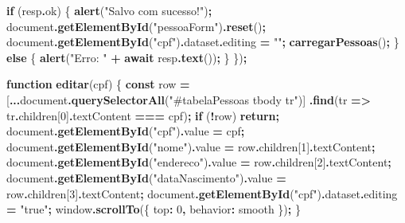 \documentclass[
]{book}
\newenvironment{Shaded}{\begin{snugshade}}{\end{snugshade}}
\newcommand{\AttributeTok}[1]{\textcolor[rgb]{0.13,0.29,0.53}{#1}}
\newcommand{\BuiltInTok}[1]{#1}
\newcommand{\ControlFlowTok}[1]{\textcolor[rgb]{0.13,0.29,0.53}{\textbf{#1}}}
\newcommand{\DataTypeTok}[1]{\textcolor[rgb]{0.13,0.29,0.53}{#1}}
\newcommand{\DecValTok}[1]{\textcolor[rgb]{0.00,0.00,0.81}{#1}}
\newcommand{\FunctionTok}[1]{\textcolor[rgb]{0.13,0.29,0.53}{\textbf{#1}}}
\newcommand{\KeywordTok}[1]{\textcolor[rgb]{0.13,0.29,0.53}{\textbf{#1}}}
\newcommand{\NormalTok}[1]{#1}
\newcommand{\OperatorTok}[1]{\textcolor[rgb]{0.81,0.36,0.00}{\textbf{#1}}}
\newcommand{\StringTok}[1]{\textcolor[rgb]{0.31,0.60,0.02}{#1}}
\begin{document}
\begin{Shaded}
\begin{Highlighting}[]
  \ControlFlowTok{if}\NormalTok{ (resp}\OperatorTok{.}\AttributeTok{ok}\NormalTok{) \{}
    \FunctionTok{alert}\NormalTok{(}\StringTok{"Salvo com sucesso!"}\NormalTok{)}\OperatorTok{;}
    \BuiltInTok{document}\OperatorTok{.}\FunctionTok{getElementById}\NormalTok{(}\StringTok{"pessoaForm"}\NormalTok{)}\OperatorTok{.}\FunctionTok{reset}\NormalTok{()}\OperatorTok{;}
    \BuiltInTok{document}\OperatorTok{.}\FunctionTok{getElementById}\NormalTok{(}\StringTok{"cpf"}\NormalTok{)}\OperatorTok{.}\AttributeTok{dataset}\OperatorTok{.}\AttributeTok{editing} \OperatorTok{=} \StringTok{""}\OperatorTok{;}
    \FunctionTok{carregarPessoas}\NormalTok{()}\OperatorTok{;}
\NormalTok{  \} }\ControlFlowTok{else}\NormalTok{ \{}
    \FunctionTok{alert}\NormalTok{(}\StringTok{"Erro: "} \OperatorTok{+} \ControlFlowTok{await}\NormalTok{ resp}\OperatorTok{.}\FunctionTok{text}\NormalTok{())}\OperatorTok{;}
\NormalTok{  \}}
\NormalTok{\})}\OperatorTok{;}

\KeywordTok{function} \FunctionTok{editar}\NormalTok{(cpf) \{}
  \KeywordTok{const}\NormalTok{ row }\OperatorTok{=}\NormalTok{ [}\OperatorTok{...}\BuiltInTok{document}\OperatorTok{.}\FunctionTok{querySelectorAll}\NormalTok{(}\StringTok{"\#tabelaPessoas tbody tr"}\NormalTok{)]}
    \OperatorTok{.}\FunctionTok{find}\NormalTok{(tr }\KeywordTok{=\textgreater{}}\NormalTok{ tr}\OperatorTok{.}\AttributeTok{children}\NormalTok{[}\DecValTok{0}\NormalTok{]}\OperatorTok{.}\AttributeTok{textContent} \OperatorTok{===}\NormalTok{ cpf)}\OperatorTok{;}
  \ControlFlowTok{if}\NormalTok{ (}\OperatorTok{!}\NormalTok{row) }\ControlFlowTok{return}\OperatorTok{;}
  \BuiltInTok{document}\OperatorTok{.}\FunctionTok{getElementById}\NormalTok{(}\StringTok{"cpf"}\NormalTok{)}\OperatorTok{.}\AttributeTok{value} \OperatorTok{=}\NormalTok{ cpf}\OperatorTok{;}
  \BuiltInTok{document}\OperatorTok{.}\FunctionTok{getElementById}\NormalTok{(}\StringTok{"nome"}\NormalTok{)}\OperatorTok{.}\AttributeTok{value} \OperatorTok{=}\NormalTok{ row}\OperatorTok{.}\AttributeTok{children}\NormalTok{[}\DecValTok{1}\NormalTok{]}\OperatorTok{.}\AttributeTok{textContent}\OperatorTok{;}
  \BuiltInTok{document}\OperatorTok{.}\FunctionTok{getElementById}\NormalTok{(}\StringTok{"endereco"}\NormalTok{)}\OperatorTok{.}\AttributeTok{value} \OperatorTok{=}\NormalTok{ row}\OperatorTok{.}\AttributeTok{children}\NormalTok{[}\DecValTok{2}\NormalTok{]}\OperatorTok{.}\AttributeTok{textContent}\OperatorTok{;}
  \BuiltInTok{document}\OperatorTok{.}\FunctionTok{getElementById}\NormalTok{(}\StringTok{"dataNascimento"}\NormalTok{)}\OperatorTok{.}\AttributeTok{value} \OperatorTok{=}\NormalTok{ row}\OperatorTok{.}\AttributeTok{children}\NormalTok{[}\DecValTok{3}\NormalTok{]}\OperatorTok{.}\AttributeTok{textContent}\OperatorTok{;}
  \BuiltInTok{document}\OperatorTok{.}\FunctionTok{getElementById}\NormalTok{(}\StringTok{"cpf"}\NormalTok{)}\OperatorTok{.}\AttributeTok{dataset}\OperatorTok{.}\AttributeTok{editing} \OperatorTok{=} \StringTok{"true"}\OperatorTok{;}
  \BuiltInTok{window}\OperatorTok{.}\FunctionTok{scrollTo}\NormalTok{(\{ }\DataTypeTok{top}\OperatorTok{:} \DecValTok{0}\OperatorTok{,} \DataTypeTok{behavior}\OperatorTok{:} \StringTok{\textquotesingle{}smooth\textquotesingle{}}\NormalTok{ \})}\OperatorTok{;}
\NormalTok{\}}


\end{Highlighting}
\end{Shaded}
\end{document}
